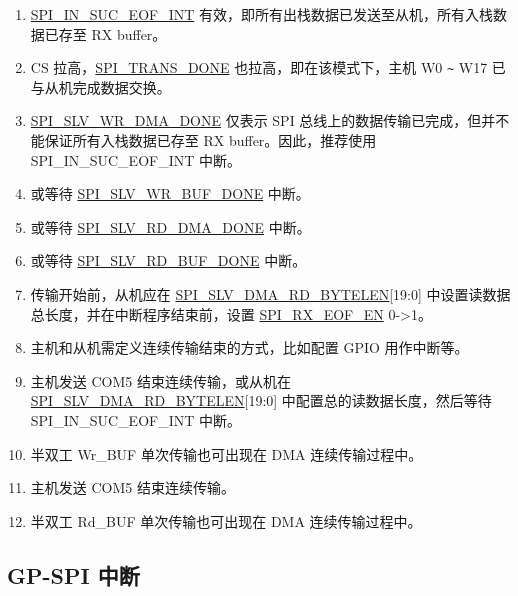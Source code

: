 \documentclass[main\_\_CN.tex]{subfiles}
\begin{document}
\begin{tiplisting}
\vspace{-2em}
\begin{enumerate}
\item \hyperref[int:SPIINSUCEOFINT]{SPI\_IN\_SUC\_EOF\_INT} 有效，即所有出栈数据已发送至从机，所有入栈数据已存至 RX buffer。\label{slave-note-1}
\item CS 拉高，\hyperref[fielddesc:SPITRANSDONE]{SPI\_TRANS\_DONE} 也拉高，即在该模式下，主机 W0 \verb+~+ W17 已与从机完成数据交换。\label{slave-note-2}
\item \hyperref[fielddesc:SPISLVWRDMADONE]{SPI\_SLV\_WR\_DMA\_DONE} 仅表示 SPI 总线上的数据传输已完成，但并不能保证所有入栈数据已存至 RX buffer。因此，推荐使用 SPI\_IN\_SUC\_EOF\_INT 中断。\label{slave-note-3}
\item 或等待 \hyperref[fielddesc:SPISLVWRBUFDONE]{SPI\_SLV\_WR\_BUF\_DONE} 中断。 \label{slave-note-4}
\item 或等待 \hyperref[fielddesc:SPISLVRDDMADONE]{SPI\_SLV\_RD\_DMA\_DONE} 中断。 \label{slave-note-5}
\item 或等待 \hyperref[fielddesc:SPISLVRDBUFDONE]{SPI\_SLV\_RD\_BUF\_DONE} 中断。\label{slave-note-6}
\item 传输开始前，从机应在 \hyperref[fielddesc:SPISLVDMARDBYTELEN]{SPI\_SLV\_DMA\_RD\_BYTELEN}[19:0] 中设置读数据总长度，并在中断程序结束前，设置 \hyperref[fielddesc:SPIRXEOFEN]{SPI\_RX\_EOF\_EN} 0->1。\label{slave-note-7}
\item 主机和从机需定义连续传输结束的方式，比如配置 GPIO 用作中断等。\label{slave-note-8}
\item 主机发送 COM5 结束连续传输，或从机在 \hyperref[fielddesc:SPISLVDMARDBYTELEN]{SPI\_SLV\_DMA\_RD\_BYTELEN}[19:0] 中配置总的读数据长度，然后等待 SPI\_IN\_SUC\_EOF\_INT 中断。\label{slave-note-9}
\item 半双工 Wr\_BUF 单次传输也可出现在 DMA 连续传输过程中。\label{slave-note-10}
\item 主机发送 COM5 结束连续传输。\label{slave-note-11}
\item 半双工 Rd\_BUF 单次传输也可出现在 DMA 连续传输过程中。\label{slave-note-12}
\end{enumerate}
\end{tiplisting}

\subsection{GP-SPI 中断} \label{Section:SPI_INT}
\end{document}
